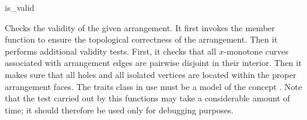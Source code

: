 
\ccRefPageBegin

\begin{ccRefFunction}{is_valid}


   {Checks the validity of the given arrangement. It first invokes the
    member function  to ensure the topological correctness
    of the arrangement. Then it performs additional validity tests. First, it
    checks that all $x$-monotone curves associated with arrangement edges are
    pairwise disjoint in their interior. Then it makes sure that all holes and
    all isolated vertices are located within the proper arrangement faces.
    The traits class in use must be a model of the concept
    . Note that the test carried out by this
    functions may take a considerable amount of time; it should therefore be
    used only for debugging purposes.}

\end{ccRefFunction}

\ccRefPageEnd
